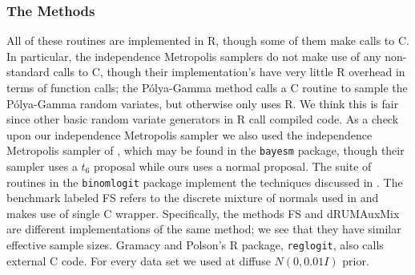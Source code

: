 \documentclass{article}
\newcommand{\Polya}{P\'{o}lya}
\begin{document}
\subsubsection{The Methods}

All of these routines are implemented in R, though some of them make calls to C.
In particular, the independence Metropolis samplers do not make use of any
non-standard calls to C, though their implementation's have very little R
overhead in terms of function calls; the \Polya-Gamma method calls a C routine
to sample the \Polya-Gamma random variates, but otherwise only uses R.  We think
this is fair since other basic random variate generators in R call compiled
code.  As a check upon our independence Metropolis sampler we also used the
independence Metropolis sampler of \cite{rossi-etal-2005}, which may be found in
the \texttt{bayesm} package, though their sampler uses a $t_6$ proposal while
ours uses a normal proposal.  The suite of routines in the \texttt{binomlogit}
package implement the techniques discussed in
\cite{fruhwirth-schnatter-fruhwirth-2010}.  The benchmark labeled FS refers to
the discrete mixture of normals used in
\cite{fruhwirth-schnatter-fruhwirth-2010} and makes use of single C wrapper.
Specifically, the methods FS and dRUMAuxMix are different implementations of the
same method; we see that they have similar effective sample sizes.  Gramacy and
Polson's R package, \texttt{reglogit}, also calls external C code.  For every
data set we used at diffuse $N(0, 0.01 I)$ prior.
\end{document}
